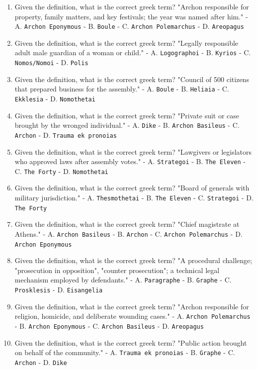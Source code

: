 \documentclass[11pt]{article}
\begin{document}
\begin{enumerate}
\item Given the definition, what is the correct greek term? "Archon responsible for property, family matters, and key festivals; the year was named after him." - A. \texttt{Archon Eponymous} - B. \texttt{Boule} - C. \texttt{Archon Polemarchus} - D. \texttt{Areopagus}
\item Given the definition, what is the correct greek term? "Legally responsible adult male guardian of a woman or child." - A. \texttt{Logographoi} - B. \texttt{Kyrios} - C. \texttt{Nomos/Nomoi} - D. \texttt{Polis}
\item Given the definition, what is the correct greek term? "Council of 500 citizens that prepared business for the assembly." - A. \texttt{Boule} - B. \texttt{Heliaia} - C. \texttt{Ekklesia} - D. \texttt{Nomothetai}
\item Given the definition, what is the correct greek term? "Private suit or case brought by the wronged individual." - A. \texttt{Dike} - B. \texttt{Archon Basileus} - C. \texttt{Archon} - D. \texttt{Trauma ek pronoias}
\item Given the definition, what is the correct greek term? "Lawgivers or legislators who approved laws after assembly votes." - A. \texttt{Strategoi} - B. \texttt{The Eleven} - C. \texttt{The Forty} - D. \texttt{Nomothetai}
\item Given the definition, what is the correct greek term? "Board of generals with military jurisdiction." - A. \texttt{Thesmothetai} - B. \texttt{The Eleven} - C. \texttt{Strategoi} - D. \texttt{The Forty}
\item Given the definition, what is the correct greek term? "Chief magistrate at Athens." - A. \texttt{Archon Basileus} - B. \texttt{Archon} - C. \texttt{Archon Polemarchus} - D. \texttt{Archon Eponymous}
\item Given the definition, what is the correct greek term? "A procedural challenge; "prosecution in opposition", "counter prosecution"; a technical legal mechanism employed by defendants." - A. \texttt{Paragraphe} - B. \texttt{Graphe} - C. \texttt{Prosklesis} - D. \texttt{Eisangelia}
\item Given the definition, what is the correct greek term? "Archon responsible for religion, homicide, and deliberate wounding cases." - A. \texttt{Archon Polemarchus} - B. \texttt{Archon Eponymous} - C. \texttt{Archon Basileus} - D. \texttt{Areopagus}
\item Given the definition, what is the correct greek term? "Public action brought on behalf of the community." - A. \texttt{Trauma ek pronoias} - B. \texttt{Graphe} - C. \texttt{Archon} - D. \texttt{Dike}

\end{enumerate}
\end{document}
